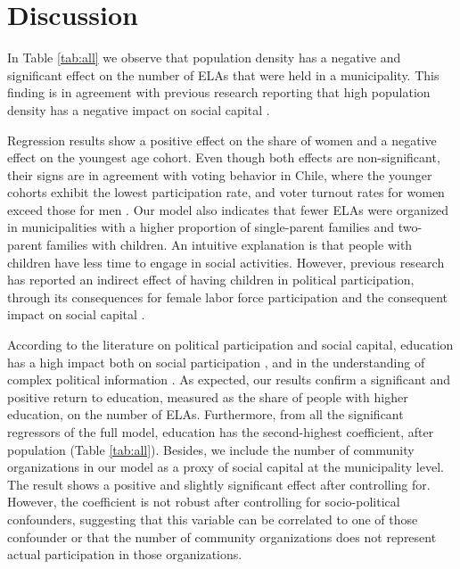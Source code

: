 \documentclass[onecolumn]{article}
\begin{document}





\section*{Discussion}
\label{sec:disc}


In Table \ref{tab:all} we observe that population density has a negative and significant effect on the number of ELAs that were held in a municipality. This finding is in agreement with previous research reporting that high population density has a negative impact on social capital \cite{mccull}. 


Regression results show a positive effect on the share of women and a negative effect on the youngest age cohort. Even though both effects are non-significant, their signs are in agreement with voting behavior in Chile, where the younger cohorts exhibit the lowest participation rate, and voter turnout rates for women exceed those for men \cite{pnud}. 
Our model also indicates that fewer ELAs were organized in municipalities with a higher proportion of single-parent families and two-parent families with children. An intuitive explanation is that people with children have less time to engage in social activities. However, previous research has reported an indirect effect of having children in political participation, through its consequences for female labor force participation and the consequent impact on social capital \cite{schlozman1999}.



According to the literature on political participation and social capital, education has a high impact both on social participation \cite{huang}, and in the understanding of complex political information \cite{verba}. As expected, our results confirm a significant and positive return to education, measured as the share of people with higher education, on the number of ELAs.  Furthermore, from all the significant regressors of the full model, education has the second-highest coefficient, after population (Table \ref{tab:all}). Besides, we include the number of community organizations in our model as a proxy of social capital at the municipality level. The result shows a positive and slightly significant effect after controlling for. However, the coefficient is not robust after controlling for socio-political confounders, suggesting that this variable can be correlated to one of those confounder or that the number of community organizations does not represent actual participation in those organizations.
\end{document}
